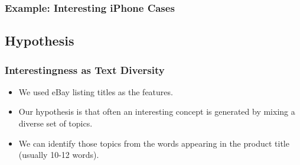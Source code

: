 \documentclass{beamer}
\begin{document}
\begin{frame}
\frametitle{Example: Interesting iPhone Cases}
\begin{figure}
\centering
{}
\label{fig:interesting}
\end{figure}
\end{frame}

\subsection{Hypothesis}

\begin{frame}
\frametitle{Interestingness as Text Diversity}
\begin{itemize}
\item We used eBay listing titles as the features.
\item Our hypothesis is that often an interesting concept is generated
  by mixing a diverse set of topics.
\item We can identify those topics from the words appearing in the
  product title (usually 10-12 words).
\end{itemize}
\end{frame}
\end{document}
